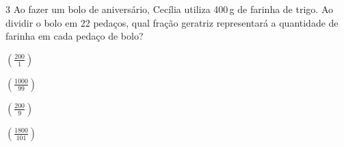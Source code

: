 






\num{3} Ao fazer um bolo de aniversário, Cecília utiliza 400\,g de farinha de
trigo. Ao dividir o bolo em 22 pedaços, qual fração geratriz
representará a quantidade de farinha em cada pedaço de bolo?

\begin{multicols}{2}
\begin{escolha}[itemsep=0pt]
\item $(\frac{200}{1})$ 
\item $(\frac{1000}{99})$ 
\item $(\frac{200}{9})$
\item $(\frac{1800}{101})$ 
\end{escolha}
\end{multicols}










